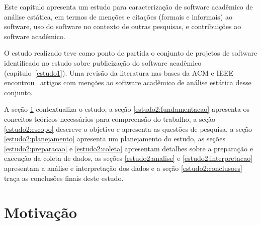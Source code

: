 {}\label{estudo2}

Este capítulo apresenta 
um estudo para caracterização de software acadêmico de análise estática,
em termos de 
menções e citações (formais e informais) ao software,
uso do software no contexto de outras pesquisas,
e contribuições ao software acadêmico.

O estudo realizado teve como ponto de partida 
o conjunto de projetos de software identificado 
no estudo sobre publicização do software acadêmico (capítulo~\ref{estudo1}).
Uma revisão da literatura nas bases da ACM e IEEE 
encontrou \SearchUniqueCount \ artigos com menções ao  
software acadêmico de análise estática 
desse conjunto.

A seção \ref{estudo2:introducao} contextualiza o estudo,
a seção \ref{estudo2:fundamentacao} apresenta os conceitos teóricos necessários para compreensão do trabalho,
a seção \ref{estudo2:escopo} descreve o objetivo e apresenta as questões de pesquisa,
a seção \ref{estudo2:planejamento} apresenta um planejamento do estudo,
as seções \ref{estudo2:preparacao} e \ref{estudo2:coleta} apresentam detalhes sobre a preparação e execução da coleta de dados,
as seções \ref{estudo2:analise} e \ref{estudo2:interpretacao} apresentam a análise e interpretação dos dados e
a seção \ref{estudo2:conclusoes} traça as conclusões finais deste estudo.

\section{Motivação} \label{estudo2:introducao} %



